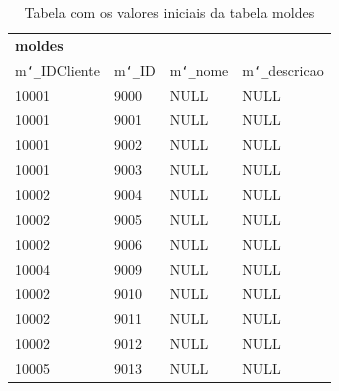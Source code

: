 \documentclass[11pt,twoside,a4paper]{report}
\begin{document}
\begin{table}[H]
	\centering
	\begin{tabular}{|l|l|l|l|}
		\multicolumn{4}{l}{\textbf{moldes}}\\ \cline{1-4}
		m\texttt{\char`_}IDCliente & m\texttt{\char`_}ID & 
		m\texttt{\char`_}nome & 
		m\texttt{\char`_}descricao\\ \cline{1-4}
		10001 & 9000 & NULL & NULL\\ \cline{1-4}
		10001 & 9001 & NULL & NULL\\ \cline{1-4}
		10001 & 9002 & NULL & NULL\\ \cline{1-4}
		10001 & 9003 & NULL & NULL\\ \cline{1-4}
		10002 & 9004 & NULL & NULL\\ \cline{1-4}
		10002 & 9005 & NULL & NULL\\ \cline{1-4}
		10002 & 9006 & NULL & NULL\\ \cline{1-4}
		10004 & 9009 & NULL & NULL\\ \cline{1-4}
		10002 & 9010 & NULL & NULL\\ \cline{1-4}
		10002 & 9011 & NULL & NULL\\ \cline{1-4}
		10002 & 9012 & NULL & NULL\\ \cline{1-4}
		10005 & 9013 & NULL & NULL\\ \cline{1-4}
	\end{tabular}
	\caption[Tabela com os valores iniciais da tabela moldes]{Tabela com os valores iniciais da tabela moldes}
	\label{tab:dados4}
\end{table}
\end{document}

